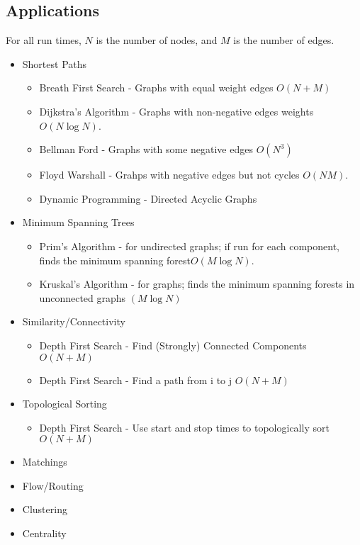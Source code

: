 \subsection{Applications}
For all run times, $N$ is the number of nodes, and $M$ is the number of edges.
\begin{itemize}
    \item Shortest Paths
        \begin{itemize}
            \item Breath First Search - Graphs with equal weight edges $O(N+M)$
            \item Dijkstra's Algorithm - Graphs with non-negative edges weights $O(N \log N)$.
            \item Bellman Ford - Graphs with some negative edges $O(N^3)$
            \item Floyd Warshall - Grahps with negative edges but not cycles $O(NM)$.
            \item Dynamic Programming - Directed Acyclic Graphs
        \end{itemize}
    \item Minimum Spanning Trees 
        \begin{itemize}
            \item Prim's Algorithm - for undirected graphs; if run for each component, finds the minimum spanning forest$O(M \log N)$.
            \item Kruskal's Algorithm - for graphs; finds the minimum spanning forests in unconnected graphs $(M \log N)$
        \end{itemize}
    \item Similarity/Connectivity
        \begin{itemize}
            \item Depth First Search - Find (Strongly) Connected Components $O(N+M)$
            \item Depth First Search - Find a path from i to j $O(N+M)$
        \end{itemize}
    \item Topological Sorting 
        \begin{itemize}
            \item Depth First Search - Use start and stop times to topologically sort $O(N+M)$
        \end{itemize}
    \item Matchings
    \item Flow/Routing
    \item Clustering
    \item Centrality
\end{itemize}
